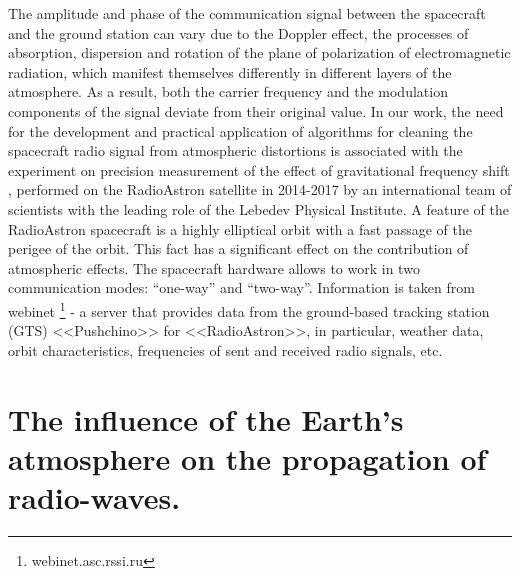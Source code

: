\documentclass[a4paper,english,bopenany]{article}
\begin{document}
 {The amplitude and phase of the communication signal between the spacecraft and the ground station can vary due to the Doppler effect, the processes of absorption, dispersion and rotation of the plane of polarization of electromagnetic radiation, which manifest themselves differently in different layers of the atmosphere. As a result, both the carrier frequency and the modulation components of the signal deviate from their original value. In our work, the need for the development and practical application of algorithms for cleaning the spacecraft radio signal from atmospheric distortions is associated with the experiment on precision measurement of the effect of gravitational frequency shift \cite{RadioAstron}, performed on the RadioAstron satellite in 2014-2017 by an international team of scientists with the leading role of the Lebedev Physical Institute. A feature of the RadioAstron spacecraft is a highly elliptical orbit with a fast passage of the perigee of the orbit. This fact has a significant effect on the contribution of atmospheric effects. The spacecraft hardware allows to work in two communication modes: “one-way” and “two-way”. Information is taken from webinet \footnote{webinet.asc.rssi.ru} - a server that provides data from the ground-based tracking station (GTS) <<Pushchino>> for <<RadioAstron>>, in particular, weather data, orbit characteristics, frequencies of sent and received radio signals, etc.}

\section{The influence of the Earth’s atmosphere on the propagation of radio-waves.} 
\end{document}
